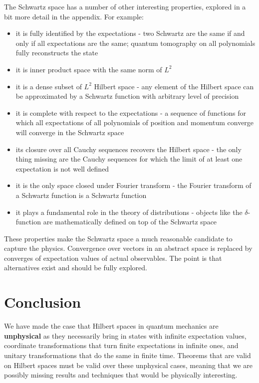\documentclass[10pt,twocolumn, nofootinbib]{revtex4-2}
\begin{document}
The Schwartz space has a number of other interesting properties, explored in a bit more detail in the appendix. For example:
\begin{itemize}
	\item it is fully identified by the expectations - two Schwartz are the same if and only if all expectations are the same; quantum tomography on all polynomials fully reconstructs the state
	\item it is inner product space with the same norm of $L^2$
	\item it is a dense subset of $L^2$ Hilbert space - any element of the Hilbert space can be approximated by a Schwartz function with arbitrary level of precision
	\item it is complete with respect to the expectations - a sequence of functions for which all expectations of all polynomials of position and momentum converge will converge in the Schwartz space  
	\item its closure over all Cauchy sequences recovers the Hilbert space - the only thing missing are the Cauchy sequences for which the limit of at least one expectation is not well defined
	\item it is the only space closed under Fourier transform - the Fourier transform of a Schwartz function is a Schwartz function
	\item it plays a fundamental role in the theory of distributions - objects like the $\delta$-function are mathematically defined on top of the Schwartz space
\end{itemize}
These properties make the Schwartz space a much reasonable candidate to capture the physics. Convergence over vectors in an abstract space is replaced by converges of expectation values of actual observables. The point is that alternatives exist and should be fully explored.

\section{Conclusion}

We have made the case that Hilbert spaces in quantum mechanics are \textbf{unphysical} as they necessarily bring in states with infinite expectation values, coordinate transformations that turn finite expectations in infinite ones, and unitary transformations that do the same in finite time. Theorems that are valid on Hilbert spaces must be valid over these unphysical cases, meaning that we are possibly missing results and techniques that would be physically interesting.
\end{document}

